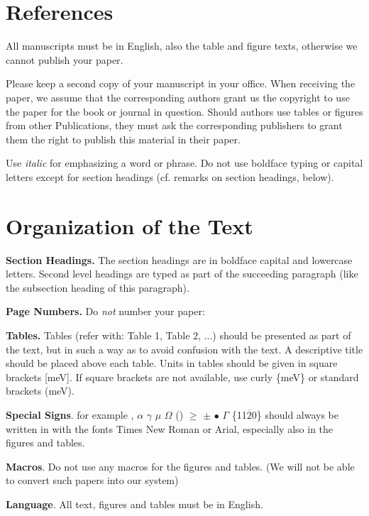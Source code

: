 \documentclass{ttp}
\begin{document}
\section{References}
All manuscripts must be in English, also the table and figure texts, otherwise we cannot publish your paper.

Please keep a second copy of your manuscript in your office. When receiving the paper, we assume
that the corresponding authors grant us the copyright to use the paper for the book or journal in question.
Should authors use tables or figures from other Publications, they must ask the corresponding publishers to
grant them the right to publish this material in their paper.

Use \textit{italic} for emphasizing a word or phrase.
Do not use boldface typing or capital letters except for section headings (cf. remarks on section headings, below).


\section{Organization of the Text}


\noindent \textbf{Section Headings.} The section headings are in boldface capital and lowercase letters.
Second level headings are typed as part of the succeeding paragraph (like the subsection heading of this paragraph).

\textbf{Page Numbers.} Do \textit{not} number your paper:

\textbf{Tables.} Tables (refer with: Table 1, Table 2, ...) should be presented as part of the text, but in such a
way as to avoid confusion with the text. A descriptive title should be placed above each table. Units in tables should
 be given in square brackets [meV]. If square brackets are not available, use curly \{meV\} or standard brackets (meV).

\textbf{Special Signs}. for example , $\alpha$ $\gamma$  $\mu$ $\Omega$ () $\ge$  $\pm$ $\bullet$  $\Gamma$ \{11$\overline{2}$0\} should always be written in with the
fonts Times New Roman or Arial, especially also in the figures and tables.

\textbf{Macros}. Do not use any macros for the figures and tables. (We will not be able to convert such papers into our system)
\newpage

\textbf{Language}. All text, figures and tables must be in English.
\end{document}
